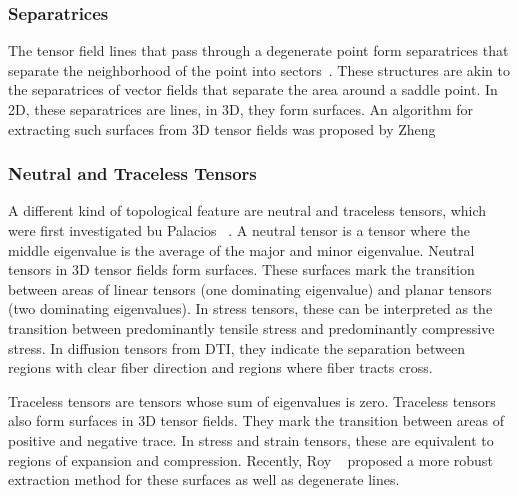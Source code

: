 \subsubsection{Separatrices} %
%
The tensor field lines that pass through a degenerate point form separatrices
that separate the neighborhood of the point into sectors~\cite{Delmarcelle1994}.
%
These structures are akin to the separatrices of vector fields that separate
the area around a saddle point.
%
In \ac{2D}, these separatrices are lines, in \ac{3D}, they form surfaces.
%
An algorithm for extracting such surfaces from \ac{3D} tensor fields was
proposed by Zheng \etal~\cite{Zheng2005b}
%

\subsubsection{Neutral and Traceless Tensors} %
%
A different kind of topological feature are neutral and traceless tensors,
which were first investigated bu Palacios \etal~\cite{Palacios2016}.
%
A neutral tensor is a tensor where the middle eigenvalue is the average of the
major and minor eigenvalue.
%
Neutral tensors in \ac{3D} tensor fields form surfaces.
%
These surfaces mark the transition between areas of linear tensors (one
dominating eigenvalue) and planar tensors (two dominating eigenvalues).
%
In stress tensors, these can be interpreted as the transition between
predominantly tensile stress and predominantly compressive stress.
%
In diffusion tensors from \ac{DTI}, they indicate the separation between
regions with clear fiber direction and regions where fiber tracts cross.
%

%
Traceless tensors are tensors whose sum of eigenvalues is zero.
%
Traceless tensors also form surfaces in \ac{3D} tensor fields.
%
They mark the transition between areas of positive and negative trace.
%
In stress and strain tensors, these are equivalent to regions of expansion and
compression.
%
Recently, Roy \etal~\cite{Roy2019} proposed a more robust extraction method for
these surfaces as well as degenerate lines.
%

